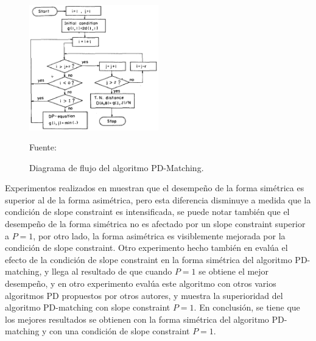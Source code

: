 \begin{enumerate}
\begin{enumerate}
\begin{figure}[H]
\begin{center}
\includegraphics[width=0.5\textwidth]{Imagenes/Cap2/image056}
\end{center}
\begin{center}
\vskip -0.5cm
\caption{\small{Diagrama de flujo del algoritmo PD-Matching.}}
\label{fig:figura2.55}
{\small{Fuente: \cite{sakoe}}}
\end{center}
\end{figure}

Experimentos realizados en \citep{sakoe} muestran que el desempeño de la forma simétrica es superior al de la forma asimétrica, pero esta diferencia disminuye a medida que la condición de slope constraint es intensificada, se puede notar también que el desempeño de la forma simétrica no es afectado por un slope constraint superior a $P = 1$, por otro lado, la forma asimétrica es visiblemente mejorada por la condición de slope constraint. 
\vskip 0.5cm
Otro experimento hecho también en \citep{sakoe} evalúa el efecto de la condición de slope constraint en la forma simétrica del algoritmo PD-matching, y llega al resultado de que cuando $P = 1$ se obtiene el mejor desempeño, y en otro experimento evalúa este algoritmo con otros varios algoritmos PD propuestos por otros autores, y muestra la superioridad del algoritmo PD-matching con slope constraint $P = 1$. 
\vskip 0.5cm
En conclusión, se tiene que los mejores resultados se obtienen con la forma simétrica del algoritmo PD-matching y con una condición de slope constraint $P = 1$.


\end{enumerate}
\end{enumerate}
